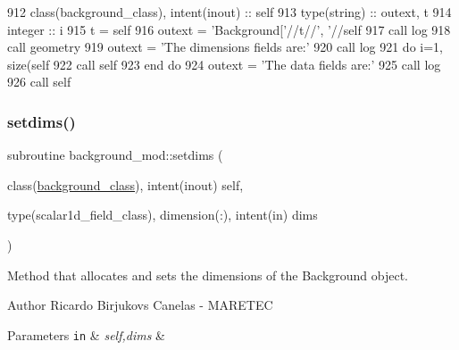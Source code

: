 \begin{DoxyCode}
912     \textcolor{keywordtype}{class}(background\_class), \textcolor{keywordtype}{intent(inout)} :: self
913     \textcolor{keywordtype}{type}(string) :: outext, t
914     \textcolor{keywordtype}{integer} :: i
915     t = self%
916     outext = \textcolor{stringliteral}{'Background['}//t//\textcolor{stringliteral}{', '}//self%
917     \textcolor{keyword}{call }log%
918     \textcolor{keyword}{call }geometry%
919     outext = \textcolor{stringliteral}{'The dimensions fields are:'}
920     \textcolor{keyword}{call }log%
921     \textcolor{keywordflow}{do} i=1, \textcolor{keyword}{size}(self%
922         \textcolor{keyword}{call }self%
923 \textcolor{keywordflow}{    end do}
924     outext = \textcolor{stringliteral}{'The data fields are:'}
925     \textcolor{keyword}{call }log%
926     \textcolor{keyword}{call }self%
\end{DoxyCode}
\mbox{\label{namespacebackground__mod_a06d96d4627391d74feb105a842a87dc0}} 
\subsubsection{\texorpdfstring{setdims()}{setdims()}}
{\footnotesize\ttfamily subroutine background\+\_\+mod\+::setdims (\begin{DoxyParamCaption}\item[{class(\mbox{\hyperlink{structbackground__mod_1_1background__class}{background\+\_\+class}}), intent(inout)}]{self,  }\item[{type(scalar1d\+\_\+field\+\_\+class), dimension(\+:), intent(in)}]{dims }\end{DoxyParamCaption})\hspace{0.3cm}{\ttfamily [private]}}



Method that allocates and sets the dimensions of the Background object. 

\begin{DoxyAuthor}{Author}
Ricardo Birjukovs Canelas -\/ M\+A\+R\+E\+T\+EC 
\end{DoxyAuthor}

\begin{DoxyParams}[1]{Parameters}
\mbox{\tt in}  & {\em self,dims} & \\
\hline
\end{DoxyParams}


